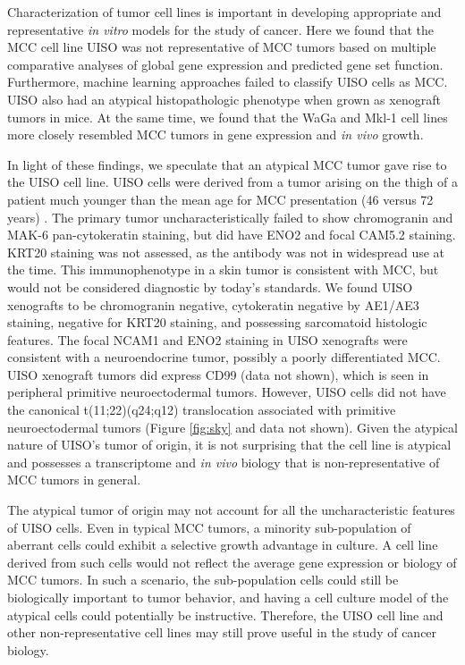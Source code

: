 \documentclass[10pt]{article}
\begin{document}
Characterization of tumor cell lines is important in developing appropriate and representative \emph{in vitro} models for the study of cancer.
Here we found that the MCC cell line UISO was not representative of MCC tumors based on multiple comparative analyses of global gene expression and predicted gene set function.
Furthermore, machine learning approaches failed to classify UISO cells as MCC. 
UISO also had an atypical histopathologic phenotype when grown as xenograft tumors in mice.
At the same time, we found that the WaGa and Mkl-1 cell lines more closely resembled MCC tumors in gene expression and \emph{in vivo} growth.

In light of these findings, we speculate that an atypical MCC tumor gave rise to the UISO cell line.
UISO cells were derived from a tumor arising on the thigh of a patient much younger than the mean age for MCC presentation (46 versus 72 years) \citep{Ronan1993Merkel}.
The primary tumor uncharacteristically failed to show chromogranin and MAK-6 pan-cytokeratin staining, but did have ENO2 and focal CAM5.2 staining.
KRT20 staining was not assessed, as the antibody was not in widespread use at the time.
This immunophenotype in a skin tumor is consistent with MCC, but would not be considered diagnostic by today's standards.
We found UISO xenografts to be chromogranin negative, cytokeratin negative by AE1/AE3 staining, negative for KRT20 staining, and possessing sarcomatoid histologic features.
The focal NCAM1 and ENO2 staining in UISO xenografts were consistent with a neuroendocrine tumor, possibly a poorly differentiated MCC.
UISO xenograft tumors did express CD99 (data not shown), which is seen in peripheral primitive neuroectodermal tumors.
However, UISO cells did not have the canonical t(11;22)(q24;q12) translocation associated with primitive neuroectodermal tumors (Figure \ref{fig:sky} and data not shown)\citep{TurcCarel1988Chromosomes}.
Given the atypical nature of UISO’s tumor of origin, it is not surprising that the cell line is atypical and possesses a transcriptome and \emph{in vivo} biology that is non-representative of MCC tumors in general.

The atypical tumor of origin may not account for all the uncharacteristic features of UISO cells.
Even in typical MCC tumors, a minority sub-population of aberrant cells could exhibit a selective growth advantage in culture.
A cell line derived from such cells would not reflect the average gene expression or biology of MCC tumors.
In such a scenario, the sub-population cells could still be biologically important to tumor behavior, and having a cell culture model of the atypical cells could potentially be instructive.
Therefore, the UISO cell line and other non-representative cell lines may still prove useful in the study of cancer biology.
\end{document}
